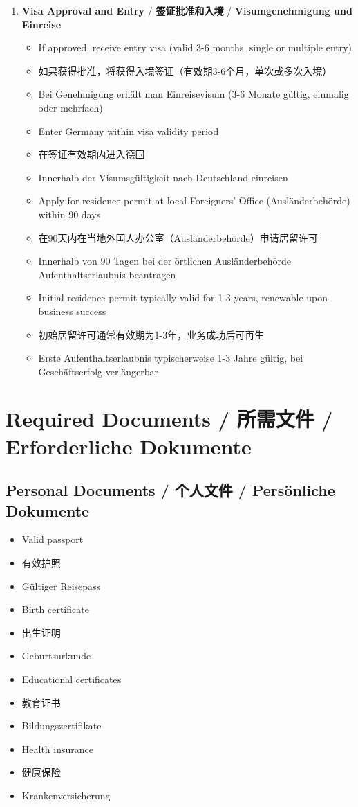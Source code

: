 \begin{enumerate}
    \item \textbf{Visa Approval and Entry} / \textbf{签证批准和入境} / \textbf{Visumgenehmigung und Einreise}
    \begin{itemize}
        \item If approved, receive entry visa (valid 3-6 months, single or multiple entry)
        \item 如果获得批准，将获得入境签证（有效期3-6个月，单次或多次入境）
        \item Bei Genehmigung erhält man Einreisevisum (3-6 Monate gültig, einmalig oder mehrfach)
        \item Enter Germany within visa validity period
        \item 在签证有效期内进入德国
        \item Innerhalb der Visumsgültigkeit nach Deutschland einreisen
        \item Apply for residence permit at local Foreigners' Office (Ausländerbehörde) within 90 days
        \item 在90天内在当地外国人办公室（Ausländerbehörde）申请居留许可
        \item Innerhalb von 90 Tagen bei der örtlichen Ausländerbehörde Aufenthaltserlaubnis beantragen
        \item Initial residence permit typically valid for 1-3 years, renewable upon business success
        \item 初始居留许可通常有效期为1-3年，业务成功后可再生
        \item Erste Aufenthaltserlaubnis typischerweise 1-3 Jahre gültig, bei Geschäftserfolg verlängerbar
    \end{itemize}
\end{enumerate}

\section{Required Documents / 所需文件 / Erforderliche Dokumente}

\subsection{Personal Documents / 个人文件 / Persönliche Dokumente}
\begin{itemize}
    \item Valid passport
    \item 有效护照
    \item Gültiger Reisepass
    \item Birth certificate
    \item 出生证明
    \item Geburtsurkunde
    \item Educational certificates
    \item 教育证书
    \item Bildungszertifikate
    \item Health insurance
    \item 健康保险
    \item Krankenversicherung
\end{itemize}

